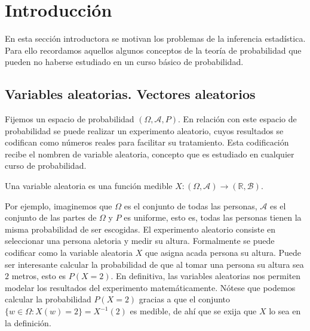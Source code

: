 

\section{Introducción}

En esta sección introductora se motivan los problemas de la inferencia estadística. Para ello recordamos aquellos algunos conceptos de la teoría de probabilidad que pueden no haberse estudiado en un curso básico de probabilidad.

\subsection{Variables aleatorias. Vectores aleatorios}

Fijemos un espacio de probabilidad $(\Omega, \mathcal{A}, P)$. En relación con este espacio de probabilidad se puede realizar un experimento aleatorio, cuyos resultados se codifican como números reales para facilitar su tratamiento. Esta codificación recibe el nombren de variable aleatoria, concepto que es estudiado en cualquier curso de probabilidad.

\begin{definition}
    Una variable aleatoria es una función medible $X: (\Omega, \mathcal{A}) \to (\mathbb{R}, \mathcal{B})$.
\end{definition}

Por ejemplo, imaginemos que $\Omega$ es el conjunto de todas las personas, $\mathcal{A}$ es el conjunto de las partes de $\Omega$ y $P$ es uniforme, esto es, todas las personas tienen la misma probabilidad de ser escogidas. El experimento aleatorio consiste en seleccionar una persona aletoria y medir su altura. Formalmente se puede codificar como la variable aleatoria $X$ que asigna acada persona su altura. Puede ser interesante calcular la probabilidad de que al tomar una persona su altura sea $2$ metros, esto es $P(X = 2)$. En definitiva, las variables aleatorias nos permiten modelar los resultados del experimento matemáticamente. Nótese que podemos calcular la probabilidad $P(X = 2)$ gracias a que el conjunto $\{w \in \Omega: X(w) = 2\} = X^{-1}(2)$ es medible, de ahí que se exija que $X$ lo sea en la definición.

